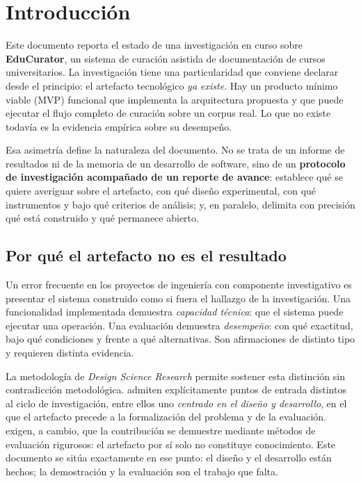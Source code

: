 \section{Introducción}
\label{sec:introduccion}

Este documento reporta el estado de una investigación en curso sobre
\textbf{EduCurator}, un sistema de curación asistida de documentación de cursos
universitarios. La investigación tiene una particularidad que conviene declarar
desde el principio: el artefacto tecnológico \emph{ya existe}. Hay un producto
mínimo viable (MVP) funcional que implementa la arquitectura propuesta y que puede
ejecutar el flujo completo de curación sobre un corpus real. Lo que no existe
todavía es la evidencia empírica sobre su desempeño.

Esa asimetría define la naturaleza del documento. No se trata de un informe de
resultados ni de la memoria de un desarrollo de software, sino de un
\textbf{protocolo de investigación acompañado de un reporte de avance}: establece
qué se quiere averiguar sobre el artefacto, con qué diseño experimental, con qué
instrumentos y bajo qué criterios de análisis; y, en paralelo, delimita con
precisión qué está construido y qué permanece abierto.

\subsection{Por qué el artefacto no es el resultado}

Un error frecuente en los proyectos de ingeniería con componente investigativo es
presentar el sistema construido como si fuera el hallazgo de la investigación. Una
funcionalidad implementada demuestra \emph{capacidad técnica}: que el sistema puede
ejecutar una operación. Una evaluación demuestra \emph{desempeño}: con qué
exactitud, bajo qué condiciones y frente a qué alternativas. Son afirmaciones de
distinto tipo y requieren distinta evidencia.

La metodología de \emph{Design Science Research} permite sostener esta distinción
sin contradicción metodológica. \textcite{peffers2007design} admiten explícitamente
puntos de entrada distintos al ciclo de investigación, entre ellos uno
\emph{centrado en el diseño y desarrollo}, en el que el artefacto precede a la
formalización del problema y de la evaluación. \textcite{hevner2004design} exigen,
a cambio, que la contribución se demuestre mediante métodos de evaluación
rigurosos: el artefacto por sí solo no constituye conocimiento. Este documento se
sitúa exactamente en ese punto: el diseño y el desarrollo están hechos; la
demostración y la evaluación son el trabajo que falta.

